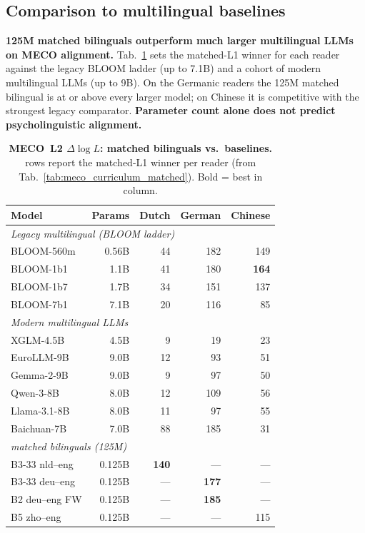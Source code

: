 \subsection{Comparison to multilingual baselines}\label{sec:meco-baselines-app}

\textbf{125M matched bilinguals outperform much larger multilingual LLMs on MECO alignment.} Tab.~\ref{tab:meco_baseline_comparators} sets the matched-L1 \beetle{} winner for each reader against the legacy BLOOM ladder (up to 7.1B) and a cohort of modern multilingual LLMs (up to 9B). On the Germanic readers the 125M matched bilingual is at or above every larger model; on Chinese it is competitive with the strongest legacy comparator. \textbf{Parameter count alone does not predict psycholinguistic alignment.}

\begin{table}[!ht]
  \centering
  \small
  \caption{\textbf{MECO~L2 $\Delta\log L$: \beetle{} matched bilinguals vs.\ baselines.} \beetle{} rows report the matched-L1 winner per reader (from Tab.~\ref{tab:meco_curriculum_matched}). Bold = best in column.}
  \label{tab:meco_baseline_comparators}
  \begin{tabular}{lrrrr}
    \toprule
    Model & Params & Dutch & German & Chinese \\
    \midrule
    \multicolumn{5}{l}{\textit{Legacy multilingual (BLOOM ladder)}} \\
    BLOOM-560m            & 0.56B & 44 & 182 & 149 \\
    BLOOM-1b1             & 1.1B  & 41 & 180 & \textbf{164} \\
    BLOOM-1b7             & 1.7B  & 34 & 151 & 137 \\
    BLOOM-7b1             & 7.1B  & 20 & 116 & 85 \\
    \midrule
    \multicolumn{5}{l}{\textit{Modern multilingual LLMs}} \\
    XGLM-4.5B             & 4.5B  & 9  & 19  & 23 \\
    EuroLLM-9B            & 9.0B  & 12 & 93  & 51 \\
    Gemma-2-9B            & 9.0B  & 9  & 97  & 50 \\
    Qwen-3-8B             & 8.0B  & 12 & 109 & 56 \\
    Llama-3.1-8B          & 8.0B  & 11 & 97  & 55 \\
    Baichuan-7B           & 7.0B  & 88 & 185 & 31 \\
    \midrule
    \multicolumn{5}{l}{\textit{\beetle{} matched bilinguals (125M)}} \\
    B3-33 nld--eng        & 0.125B & \textbf{140} & ---          & --- \\
    B3-33 deu--eng        & 0.125B & ---          & \textbf{177} & --- \\
    B2 deu--eng FW        & 0.125B & ---          & \textbf{185} & --- \\
    B5 zho--eng           & 0.125B & ---          & ---          & 115 \\
    \bottomrule
  \end{tabular}
\end{table}

